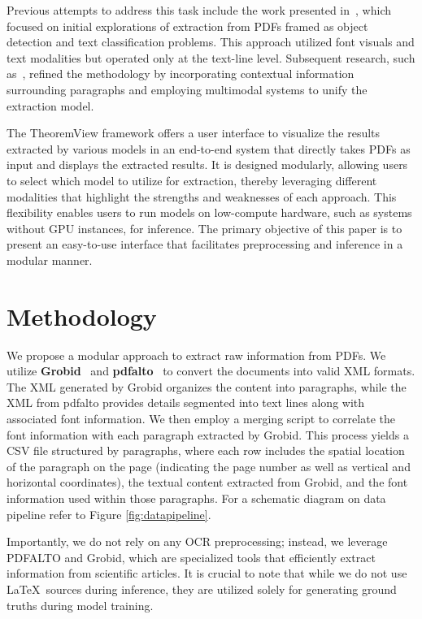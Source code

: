 \documentclass[runningheads]{llncs}
\begin{document}
Previous attempts to address this task include the work presented in~\cite{doceng_paper}, which focused on 
initial explorations of extraction from PDFs framed as object detection and text classification problems. 
This approach utilized font visuals and text modalities but operated only at the text-line level. Subsequent 
research, such as~\cite{jcdl_paper}, refined the methodology by incorporating contextual information 
surrounding paragraphs and employing multimodal systems to unify the extraction model.

The TheoremView framework offers a user interface to visualize the results extracted by various models in 
an end-to-end system that directly takes PDFs as input and displays the extracted results. It is designed 
modularly, allowing users to select which model to utilize for extraction, thereby leveraging different 
modalities that highlight the strengths and weaknesses of each approach. This flexibility enables users 
to run models on low-compute hardware, such as systems without GPU instances, for inference. The primary 
objective of this paper is to present an easy-to-use interface that facilitates preprocessing and inference 
in a modular manner.

\section{Methodology}
We propose a modular approach to extract raw information from PDFs. We utilize \textbf{Grobid}~\cite{GROBID} and \textbf{pdfalto}~\cite{pdfalto} to convert 
the documents into valid XML formats. The XML generated by Grobid organizes the content into paragraphs, 
while the XML from pdfalto provides details segmented into text lines along with associated font information. 
We then employ a merging script to correlate the font information with each paragraph extracted by Grobid. 
This process yields a CSV file structured by paragraphs, where each row includes the spatial location of the 
paragraph on the page (indicating the page number as well as vertical and horizontal coordinates), the textual content 
extracted from Grobid, and the font information used within those paragraphs. For a schematic diagram on data pipeline
refer to Figure \ref{fig:datapipeline}.

Importantly, we do not rely on any OCR preprocessing; instead, we leverage PDFALTO and Grobid, which are 
specialized tools that efficiently extract information from scientific articles. It is crucial to note that 
while we do not use \LaTeX~sources during inference, they are utilized solely for generating ground truths 
during model training.
\end{document}
